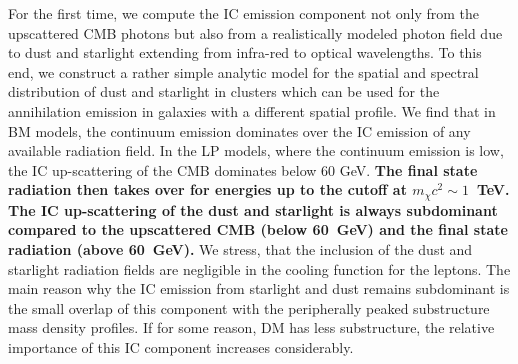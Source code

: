 \documentclass[10pt,aps,pra,reprint,amsmath,amsfonts,amssymb,showpacs,nofootinbib,floatfix]{revtex4-1}
\def\del#1{{}}
\def\C#1{{\bf #1}}
\begin{document}
For the first time, we compute the IC emission component not only from
the upscattered CMB photons but also from a realistically modeled
photon field due to dust and starlight extending from infra-red to
optical wavelengths. To this end, we construct a rather simple
analytic model for the spatial and spectral distribution of dust and
starlight in clusters which can be used for the annihilation emission
in galaxies with a different spatial profile.  We find that in BM
models, the continuum emission dominates over the IC emission of any
available radiation field. In the LP models, where the continuum
emission is low, the IC up-scattering of the CMB dominates below 60
GeV. \C{The final state radiation then takes over for energies up to
  the cutoff at $m_\chi c^2 \sim 1$~TeV. The IC up-scattering of the
  dust and starlight is always subdominant compared to the upscattered
  CMB (below 60~GeV) and the final state radiation (above 60~GeV).}
\del{For large clusters, the final state radiation then takes over for
  energies up to the cutoff at $m_\chi c^2 \sim 1$~TeV. In small
  clusters, there is a window around $E_\gamma \sim 100~\mathrm{GeV}$
  where the IC up-scattering of the dust emission dominates over the
  CMB IC emission and the final state radiation. The IC emission of
  starlight remains always subdominant.}  We stress, that the
inclusion of the dust and starlight radiation fields are negligible in
the cooling function for the leptons.  The main reason why the IC
emission from starlight and dust remains subdominant is the small
overlap of this component with the peripherally peaked substructure
mass density profiles. If for some reason, DM has less substructure,
the relative importance of this IC component increases considerably.
\end{document}
